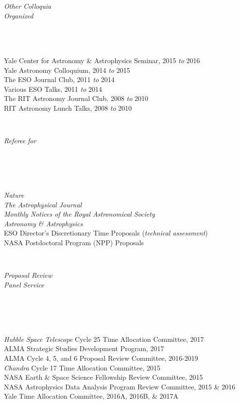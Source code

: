 \documentclass[11pt]{article}
\begin{document}
\hspace{2.5mm} \parbox{1.5in}{\textit{Other Colloquia \\ Organized \\\\\\\\} } \parbox{5.15in}{Yale Center for Astronomy \& Astrophysics Seminar, 2015 \textit{to} 2016 \\ Yale Astronomy Colloquium, 2014 \textit{to} 2015 \\ The ESO Journal Club, 2011 \textit{to} 2014 \\ Various ESO Talks, 2011 \textit{to} 2014 \\ The RIT Astronomy Journal Club, 2008 \textit{to} 2010 \\ RIT Astronomy Lunch Talks, 2008 \textit{to} 2010 }\\


\vspace{4mm}


\hspace{2.5mm} \parbox{1.5in}{\textit{Referee for \\\\\\\\\\}} \parbox{5.15in}{
\textit{Nature}\\
\textit{The Astrophysical Journal}\\
\textit{Monthly Notices of the Royal Astronomical Society}\\
\textit{Astronomy \& Astrophysics}\\
ESO Director's Discretionary Time Proposals (\textit{technical assessment}) \\
NASA Postdoctoral Program (NPP) Proposals} \\


\vspace{4mm}


\hspace{2.5mm} \parbox{1.5in}{\textit{Proposal Review \\ Panel Service \\\\\\\\\\}} \parbox{5.15in}{
\textit{Hubble Space Telescope} Cycle 25 Time Allocation Committee, 2017 \\
ALMA Strategic Studies Development Program, 2017 \\
ALMA Cycle 4, 5, and 6 Proposal Review Committee, 2016-2019 \\\textit{Chandra} Cycle 17 Time Allocation Committee, 2015  \\ NASA Earth \& Space Science Fellowship Review Committee, 2015 \\
NASA Astrophysics Data Analysis Program Review Committee, 2015 \& 2016 \\
Yale Time Allocation Committee, 2016A, 2016B, \& 2017A} \\
\end{document}

